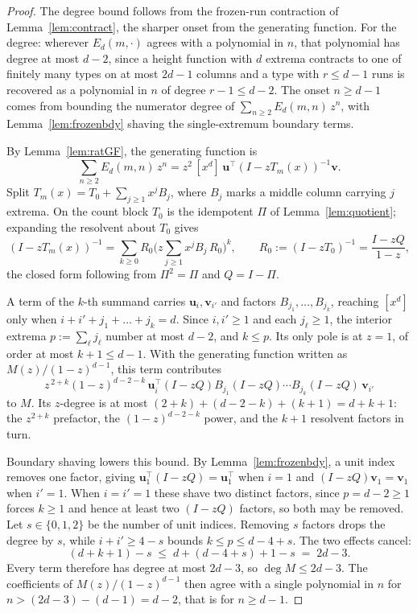\documentclass[11pt]{article}
\theoremstyle{definition}
\theoremstyle{remark}
\begin{document}
\begin{proof}
The degree bound follows from the frozen-run contraction of
Lemma~\ref{lem:contract}, the sharper onset from the generating function. For the
degree: wherever $E_d(m,\cdot)$ agrees with a polynomial in $n$, that polynomial
has degree at most $d-2$, since a height function with $d$ extrema contracts to
one of finitely many types on at most $2d-1$ columns and a type with $r\le d-1$
runs is recovered as a polynomial in $n$ of degree $r-1\le d-2$. The onset $n\ge d-1$
comes from bounding the numerator degree of $\sum_{n\ge2}E_d(m,n)\,z^n$, with
Lemma~\ref{lem:frozenbdy} shaving the single-extremum boundary terms.

\medskip\noindent By Lemma~\ref{lem:ratGF}, the generating function
is
\[
  \sum_{n\ge2}E_d(m,n)\,z^n=z^2\,[x^d]\,\mathbf u^{\!\top}(I-zT_m(x))^{-1}\mathbf v .
\]
Split $T_m(x)=T_0+\sum_{j\ge1}x^jB_j$, where $B_j$ marks a middle column carrying
$j$ extrema. On the count block $T_0$ is the idempotent $\Pi$ of
Lemma~\ref{lem:quotient}; expanding the resolvent about $T_0$ gives
\[
  (I-zT_m(x))^{-1}=\sum_{k\ge0}R_0\Big(z\textstyle\sum_{j\ge1}x^jB_j\,R_0\Big)^k,
  \qquad R_0:=(I-zT_0)^{-1}=\frac{I-zQ}{1-z},
\]
the closed form following from $\Pi^2=\Pi$ and $Q=I-\Pi$.

\smallskip\noindent
A term of the $k$-th summand carries $\mathbf u_i,\mathbf v_{i'}$ and factors
$B_{j_1},\dots,B_{j_k}$, reaching $[x^d]$ only when $i+i'+j_1+\dots+j_k=d$. Since
$i,i'\ge1$ and each $j_\ell\ge1$, the interior extrema $p:=\sum_\ell j_\ell$
number at most $d-2$, and $k\le p$. Its only pole is at $z=1$, of order at most
$k+1\le d-1$. With the generating function written as $M(z)/(1-z)^{d-1}$, this term
contributes
\[
  z^{\,2+k}(1-z)^{d-2-k}\,
  \mathbf u_i^{\!\top}(I-zQ)B_{j_1}(I-zQ)\cdots B_{j_k}(I-zQ)\,\mathbf v_{i'}
\]
to $M$. Its $z$-degree is at most $(2+k)+(d-2-k)+(k+1)=d+k+1$: the $z^{2+k}$
prefactor, the $(1-z)^{d-2-k}$ power, and the $k+1$ resolvent factors in turn.

\smallskip\noindent
Boundary shaving lowers this bound. By Lemma~\ref{lem:frozenbdy}, a unit index
removes one factor, giving $\mathbf u_1^{\!\top}(I-zQ)=\mathbf u_1^{\!\top}$ when $i=1$
and $(I-zQ)\mathbf v_1=\mathbf v_1$ when $i'=1$. When $i=i'=1$ these shave two
distinct factors, since $p=d-2\ge1$ forces $k\ge1$ and hence at least two
$(I-zQ)$ factors, so both may be removed. Let $s\in\{0,1,2\}$ be the
number of unit indices. Removing $s$ factors drops the degree by $s$, while
$i+i'\ge4-s$ bounds $k\le p\le d-4+s$. The two effects cancel:
\[
  (d+k+1)-s \;\le\; d+(d-4+s)+1-s \;=\; 2d-3 .
\]
Every term therefore has degree at most $2d-3$, so $\deg M\le2d-3$. The
coefficients of $M(z)/(1-z)^{d-1}$ then agree with a single polynomial in $n$
for $n>(2d-3)-(d-1)=d-2$, that is for $n\ge d-1$.
\end{proof}
\end{document}
